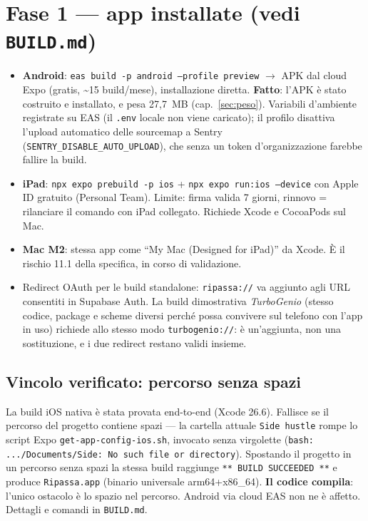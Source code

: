 \documentclass[11pt,a4paper]{report}
\begin{document}
\section{Fase 1 — app installate (vedi \texttt{BUILD.md})}
\begin{itemize}[nosep]
  \item \textbf{Android}: \texttt{eas build -p android --profile preview}
        $\rightarrow$ APK dal cloud Expo (gratis, \textasciitilde15
        build/mese), installazione diretta. \textbf{Fatto}: l'APK \`e stato
        costruito e installato, e pesa 27,7~MB (cap.~\ref{sec:peso}).
        Variabili d'ambiente registrate su EAS (il \texttt{.env} locale non
        viene caricato); il profilo disattiva l'upload automatico delle
        sourcemap a Sentry (\texttt{SENTRY\_DISABLE\_AUTO\_UPLOAD}), che senza
        un token d'organizzazione farebbe fallire la build.
  \item \textbf{iPad}: \texttt{npx expo prebuild -p ios} +
        \texttt{npx expo run:ios --device} con Apple ID gratuito (Personal
        Team). Limite: firma valida 7 giorni, rinnovo = rilanciare il
        comando con iPad collegato. Richiede Xcode e CocoaPods sul Mac.
  \item \textbf{Mac M2}: stessa app come ``My Mac (Designed for iPad)'' da
        Xcode. \`E il rischio 11.1 della specifica, in corso di validazione.
  \item Redirect OAuth per le build standalone: \texttt{ripassa://} va
        aggiunto agli URL consentiti in Supabase Auth. La build dimostrativa
        \emph{TurboGenio} (stesso codice, package e scheme diversi perch\'e
        possa convivere sul telefono con l'app in uso) richiede allo stesso
        modo \texttt{turbogenio://}: \`e un'aggiunta, non una sostituzione, e
        i due redirect restano validi insieme.
\end{itemize}

\subsection*{Vincolo verificato: percorso senza spazi}
La build iOS nativa \`e stata provata end-to-end (Xcode 26.6). Fallisce se il
percorso del progetto contiene spazi — la cartella attuale
\texttt{Side hustle} rompe lo script Expo \texttt{get-app-config-ios.sh},
invocato senza virgolette (\texttt{bash: .../Documents/Side: No such file or
directory}). Spostando il progetto in un percorso senza spazi la stessa build
raggiunge \texttt{** BUILD SUCCEEDED **} e produce \texttt{Ripassa.app}
(binario universale arm64+x86\_64). \textbf{Il codice compila}: l'unico
ostacolo \`e lo spazio nel percorso. Android via cloud EAS non ne \`e
affetto. Dettagli e comandi in \texttt{BUILD.md}.
\end{document}
